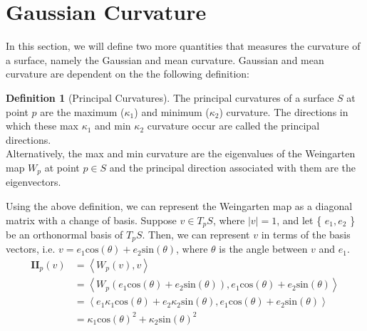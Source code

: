 \documentclass{article}
\theoremstyle{plain}
\theoremstyle{definition}
\newtheorem{definition}{Definition}
\theoremstyle{remark}
\begin{document}

\section{Gaussian Curvature}
In this section, we will define two more quantities that measures the curvature of a surface, namely the Gaussian and mean curvature. Gaussian and mean curvature are dependent on the the following definition:

\begin{definition}[Principal Curvatures]
    The principal curvatures of a surface \( S\) at point \(p\) are the maximum (\(\kappa_1\)) and minimum (\( \kappa_2 \)) curvature. The directions in which these max \(\kappa_1\) and min \(\kappa_2\) curvature occur are called the principal directions. \\
    Alternatively, the max and min curvature are the eigenvalues of the Weingarten map \( W_p\) at point \(p \in S\) and the principal direction associated with them are the eigenvectors.
\end{definition}

Using the above definition, we can represent the Weingarten map as a diagonal matrix with a change of basis. Suppose \(v \in T_pS\), where \(|v| = 1\), and let \{ \(e_1, e_2\) \} be an  orthonormal basis of \( T_pS\). Then, we can represent \(v\) in terms of the basis vectors, i.e. \( v = e_1 \text{cos}(\theta) + e_2 \text{sin}(\theta)\), where \( \theta \) is the angle between \( v\) and \( e_1\).
\begin{align*}
    \mathbf{II}_p(v) & = \left\langle W_p(v), v\right\rangle                                                                                                          \\
                     & = \left\langle W_p(e_1 \text{cos}(\theta) + e_2 \text{sin}(\theta)), e_1 \text{cos}(\theta) + e_2 \text{sin}(\theta) \right\rangle             \\
                     & = \left\langle e_1 \kappa_1 \text{cos}(\theta) + e_2 \kappa_2 \text{sin}(\theta), e_1 \text{cos}(\theta) + e_2 \text{sin}(\theta)\right\rangle \\
                     & = \kappa_1 \text{cos}(\theta)^2 + \kappa_2 \text{sin}(\theta)^2
\end{align*}
\end{document}
